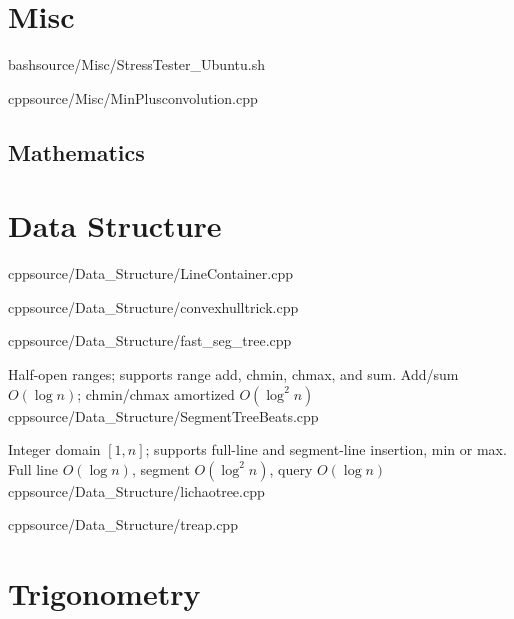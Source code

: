 \documentclass[portrait, 8pt, a4paper, oneside, twocolumn]{extarticle}
\begin{document}
\maketitlepage


\section{Misc}


{}{}
{bash}{source/Misc/StressTester_Ubuntu.sh}


{}{}
{cpp}{source/Misc/MinPlusconvolution.cpp}

\subsection{Mathematics} 






\section {Data Structure}

{}{}
{cpp}{source/Data_Structure/LineContainer.cpp}

{}{}
{cpp}{source/Data_Structure/convexhulltrick.cpp}

{}{}
{cpp}{source/Data_Structure/fast_seg_tree.cpp}

{Half-open ranges; supports range add, chmin, chmax, and sum.}
{Add/sum $O(\log n)$; chmin/chmax amortized $O(\log^2 n)$}
{cpp}{source/Data_Structure/SegmentTreeBeats.cpp}

{Integer domain $[1,n]$; supports full-line and segment-line insertion, min or max.}
{Full line $O(\log n)$, segment $O(\log^2 n)$, query $O(\log n)$}
{cpp}{source/Data_Structure/lichaotree.cpp}

{}{}
{cpp}{source/Data_Structure/treap.cpp}









\section{Trigonometry}

\end{document}
